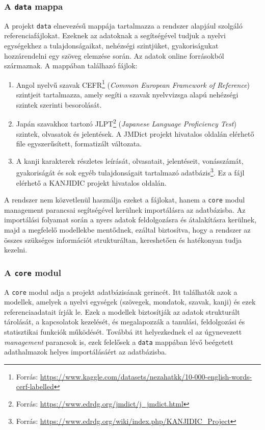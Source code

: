 \subsubsection{A \texttt{data} mappa}

A projekt \texttt{data} elnevezésű mappája tartalmazza a rendszer alapjául szolgáló referenciafájlokat. Ezeknek az adatoknak a segítségével tudjuk a nyelvi egységekhez a tulajdonságaikat, nehézségi szintjüket, gyakoriságukat hozzárendelni egy szöveg elemzése során. Az adatok online forrásokból származnak. A mappában találhazó fájlok:

\begin{enumerate}
  \item[\texttt{cefr\_clean.csv}] Angol nyelvű szavak CEFR\footnote{Forrás: \url{https://www.kaggle.com/datasets/nezahatkk/10-000-english-words-cerf-labelled}\cite{cefr}} (\textit{Common European Framework of Reference}) szintjeit tartalmazza, amely segíti a szavak nyelvvizsga alapú nehézségi szintek szerinti besorolását.
  \item[\texttt{jmdict\_jlpt\_merge.csv}] Japán szavakhoz tartozó JLPT\footnote{Forrás: \url{https://www.edrdg.org/jmdict/j_jmdict.html}\cite{jmdict}} (\textit{Japanese Language Proficiency Test}) szintek, olvasatok és jelentések. A JMDict projekt hivatalos oldalán elérhető file egyszerűsített, formatizált változata.
  \item[\texttt{kanjidic2.xml}] A kanji karakterek részletes leírását, olvasatait, jelentéseit, vonásszámát, gyakoriságát és sok egyéb tulajdonságait tartalmazó adatbázis\footnote{Forrás: \url{https://www.edrdg.org/wiki/index.php/KANJIDIC_Project}\cite{kanjidic}}. Ez a fájl elérhető a KANJIDIC projekt hivatalos oldalán.
\end{enumerate}

A rendszer nem közvetlenül használja ezeket a fájlokat, hanem a \texttt{core} modul management parancsai segítségével kerülnek importálásra az adatbázisba. Az importálási folyamat során a nyers adatok feldolgozásra és átalakításra kerülnek, majd a megfelelő modellekbe mentődnek, ezáltal biztosítva, hogy a rendszer az összes szükséges információt strukturáltan, kereshetően és hatékonyan tudja kezelni.

\subsubsection{A \texttt{core} modul}

A \texttt{core} modul adja a projekt adatbázisának gerincét. Itt találhatók azok a modellek, amelyek a nyelvi egységek (szövegek, mondatok, szavak, kanji) és ezek referenciaadatait írják le. Ezek a modellek biztosítják az adatok strukturált tárolását, a kapcsolatok kezelését, és megalapozzák a tanulási, feldolgozási és statisztikai funkciók működését. Továbbá itt helyezkednek el az úgynevezett \textit{management} parancsok is, ezek felelősek a \texttt{data} mappában lévő beégetett adathalmazok helyes importálásáért az adatbázisba.

